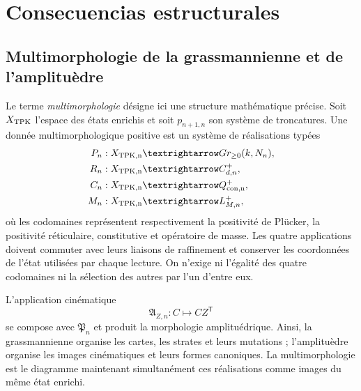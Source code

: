 \section{Consecuencias estructurales}

\subsection{Multimorphologie de la grassmannienne et de l’amplituèdre}

Le terme \emph{multimorphologie} désigne ici une structure mathématique précise. Soit \(\widehat{\mathcal X}_{\rm TPK}\) l’espace des états enrichis et soit \(p_{n+1,n}\) son système de troncatures. Une donnée multimorphologique positive est un système de réalisations typées
\[
\begin{aligned}
\mathfrak P_n&:\widehat{\mathcal X}_{\rm TPK,n}
 \longrightarrow \operatorname{Gr}_{\geq0}(k,N_n),\\
\mathfrak R_n&:\widehat{\mathcal X}_{\rm TPK,n}
 \longrightarrow C^{+}_{d,n},\\
\mathfrak C_n&:\widehat{\mathcal X}_{\rm TPK,n}
 \longrightarrow \mathcal Q^{+}_{\rm con,n},\\
\mathfrak M_n&:\widehat{\mathcal X}_{\rm TPK,n}
 \longrightarrow \mathcal L^{+}_{M,n},
\end{aligned}
\]
où les codomaines représentent respectivement la positivité de Plücker, la positivité réticulaire, constitutive et opératoire de masse. Les quatre applications doivent commuter avec leurs liaisons de raffinement et conserver les coordonnées de l’état utilisées par chaque lecture. On n’exige ni l’égalité des quatre codomaines ni la sélection des autres par l’un d’entre eux.

L’application cinématique
\[
\mathfrak A_{Z,n}:C\longmapsto CZ^{\mathsf T}
\]
se compose avec \(\mathfrak P_n\) et produit la morphologie amplituédrique. Ainsi, la grassmannienne organise les cartes, les strates et leurs mutations ; l’amplituèdre organise les images cinématiques et leurs formes canoniques. La multimorphologie est le diagramme maintenant simultanément ces réalisations comme images du même état enrichi.

